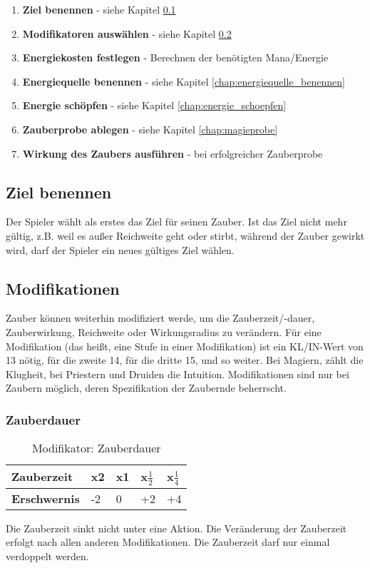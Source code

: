 \begin{enumerate}
\item \textbf{Ziel benennen} - siehe Kapitel \ref{chap:ziel_benennen}
\item \textbf{Modifikatoren auswählen} - siehe Kapitel \ref{chap:zauber_modifikationen}
\item \textbf{Energiekosten festlegen} - Berechnen der benötigten Mana/Energie
\item \textbf{Energiequelle benennen} - siehe Kapitel \ref{chap:energiequelle_benennen}
\item \textbf{Energie schöpfen} - siehe Kapitel \ref{chap:energie_schoepfen}
\item \textbf{Zauberprobe ablegen} - siehe Kapitel \ref{chap:magieprobe}
\item \textbf{Wirkung des Zaubers ausführen} - bei erfolgreicher Zauberprobe
\end{enumerate}

\subsection{Ziel benennen}
\label{chap:ziel_benennen}
Der Spieler wählt als erstes das Ziel für seinen Zauber. Ist das Ziel nicht mehr gültig, z.B. weil es außer Reichweite geht oder stirbt, während der Zauber gewirkt wird, darf der Spieler ein neues gültiges Ziel wählen.

\subsection{Modifikationen}
\label{chap:zauber_modifikationen}
Zauber können weiterhin modifiziert werde, um die Zauberzeit/-dauer, Zauberwirkung, Reichweite oder Wirkungsradius zu verändern. Für eine Modifikation (das heißt, eine Stufe in einer Modifikation) ist ein KL/IN-Wert von 13 nötig, für die zweite 14, für die dritte 15, und so weiter. Bei Magiern, zählt die Klugheit, bei Priestern und Druiden die Intuition. Modifikationen sind nur bei Zaubern möglich, deren Spezifikation der Zaubernde beherrscht.

\subsubsection{Zauberdauer}
\begin{table}[H]
\begin{center}
\begin{tabular}{|l|l|l|l|l|}
\hline
\textbf{Zauberzeit} & x2 & x1 & x$\frac{1}{2}$ & x$\frac{1}{4}$ \\ \hline
\textbf{Erschwernis} & -2 & 0 & +2 & +4 \\ \hline

\end{tabular}
\end{center}
\caption{Modifikator: Zauberdauer}
\label{tab:modifikator_zauberdauer}
\end{table}
Die Zauberzeit sinkt nicht unter eine Aktion. Die Veränderung der Zauberzeit erfolgt nach allen anderen Modifikationen. Die Zauberzeit darf nur einmal verdoppelt werden.


